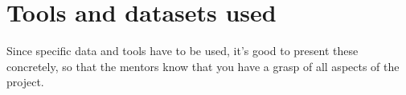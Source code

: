 \section{Tools and datasets used}
Since specific data and tools have to be used, it’s good to present these concretely, so that the mentors know that you have a grasp of all aspects of the project.